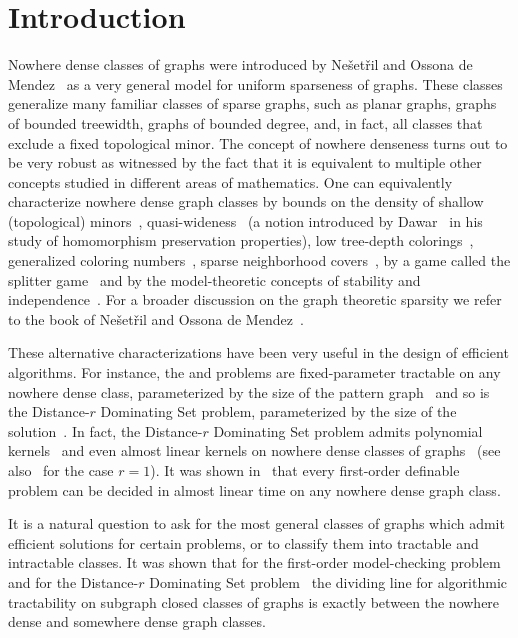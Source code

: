 \section{Introduction}

Nowhere dense classes of graphs were introduced 
by Ne\v set\v ril and Ossona de 
Mendez~\cite{nevsetvril2010first,nevsetvril2011nowhere} as a very 
general model
for uniform sparseness of graphs. These classes generalize many 
familiar classes of sparse graphs, such as planar graphs, graphs 
of bounded treewidth,  graphs of bounded degree, and, in fact, 
all classes that exclude a fixed 
topological minor.
The concept of nowhere denseness
turns out to be very robust as witnessed by the fact that it is equivalent 
to multiple other concepts studied in different areas of mathematics. 
One can equivalently characterize nowhere dense graph classes 
by bounds on the density of shallow (topological)
minors~\cite{nevsetvril2010first,nevsetvril2011nowhere},
quasi-wideness~\cite{nevsetvril2011nowhere} (a notion introduced by
Dawar~\cite{dawar2010homomorphism} in his study of homomorphism
preservation properties), low tree-depth
colorings~\cite{nevsetvril2008grad}, generalized coloring
numbers~\cite{zhu2009coloring}, sparse neighborhood
covers~\cite{GroheKRSS15,grohe2014deciding}, by a game called the
splitter game~\cite{grohe2014deciding} and by the model-theoretic
concepts of stability and independence~\cite{adler2014interpreting}.
For a broader discussion on the graph theoretic sparsity we refer to the book
of Ne\v{s}et\v{r}il and Ossona de Mendez~\cite{sparsity}.

These alternative characterizations have been very useful in 
the design of efficient algorithms. For instance, 
the {} and {} problems 
are fixed-parameter tractable on any nowhere dense
class, parameterized by the size of the pattern graph~\cite{nevsetvril2010first}
and so is the {\sc Distance-$r$ Dominating Set} problem, parameterized
by the size of the solution~\cite{DawarK09}. In fact, 
the {\sc Distance-$r$ Dominating Set} problem admits
polynomial kernels~\cite{siebertz2016polynomial} and even 
almost linear kernels on nowhere dense classes of 
graphs~\cite{eickmeyer2016neighborhood}
(see also~\cite{drange2016kernelization} for the case $r=1$). 
It was shown in~\cite{grohe2014deciding}
that every first-order definable problem can be decided in
almost linear time on any nowhere dense graph class.

It is a natural question to ask for the most general classes of graphs
which admit efficient solutions for certain problems, or to 
classify them into tractable and intractable classes. It was shown 
that for the first-order model-checking problem~\cite{dvovrak2013testing} and for
the {\sc Distance-$r$ Dominating Set} problem~\cite{drange2016kernelization} 
the dividing line for algorithmic tractability 
on subgraph closed classes of graphs is exactly between the
nowhere dense and somewhere dense graph classes. 

